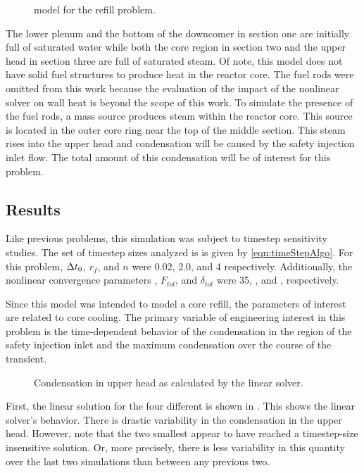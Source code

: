 \begin{figure}[h!tb]
\centering

\caption{\cobra{} model for the refill problem.}
\label{fig:refillModel}
\end{figure}

The lower plenum and the bottom of the downcomer in section one are initially full of saturated water while both the core region in section two and the upper head in section three are full of saturated steam.
Of note, this model does not have solid fuel structures to produce heat in the reactor core.
The fuel rods were omitted from this work because the evaluation of the impact of the nonlinear solver on wall heat is beyond the scope of this work.
To simulate the presence of the fuel rods, a mass source produces steam within the reactor core.
This source is located in the outer core ring near the top of the middle section.
This steam rises into the upper head and condensation will be caused by the safety injection inlet flow.
The total amount of this condensation will be of interest for this problem.

\subsection{Results}
\label{sect:refillResults}

Like previous problems, this simulation was subject to timestep sensitivity studies.
The set of timestep sizes analyzed is is given by \eqref{eqn:timeStepAlgo}.
For this problem, $\dt{}_{0}$, $r_{f}$, and ${n}$ were 0.02, 2.0, and 4 respectively.
Additionally, the nonlinear convergence parameters \kmax{}, $F_{tol}$, and $\delta_{tol}$ were 35, , and , respectively.

Since this model was intended to model a core refill, the parameters of interest are related to core cooling.
The primary variable of engineering interest in this problem is the time-dependent behavior of the condensation in the region of the safety injection inlet and the maximum condensation over the course of the transient.

\begin{figure}[h!tb]
\centering

\caption{Condensation in upper head as calculated by the linear solver.}
\label{fig:refillGammaLin}
\end{figure}

First, the linear solution for the four different \dtmax{} is shown in .
This shows the linear solver's behavior.
There is drastic variability in the condensation in the upper head.
However, note that the two smallest \dtmax{} appear to have reached a timestep-size insensitive solution.
Or, more precisely, there is less variability in this quantity over the last two simulations than between any previous two.

